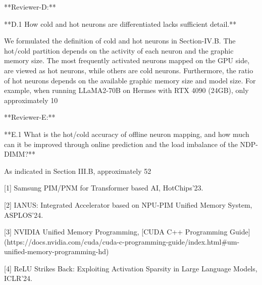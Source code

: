 **Reviewer-D:**

**D.1 How cold and hot neurons are differentiated lacks sufficient detail.**

We formulated the definition of cold and hot neurons in Section-IV.B. The hot/cold partition depends on the activity of each neuron and the graphic memory size. The most frequently activated neurons mapped on the GPU side, are viewed as hot neurons, while others are cold neurons. Furthermore, the ratio of hot neurons depends on the available graphic memory size and model size. For example, when running LLaMA2-70B on Hermes with RTX 4090 (24GB), only approximately 10%

**Reviewer-E:**

**E.1 What is the hot/cold accuracy of offline neuron mapping, and how much can it be improved through online prediction and the load imbalance of the NDP-DIMM?**

As indicated in Section III.B, approximately 52%


[1] Samsung PIM/PNM for Transformer based AI, HotChips'23. 

[2] IANUS: Integrated Accelerator based on NPU-PIM Unified Memory System, ASPLOS'24.

[3] NVIDIA Unified Memory Programming, [CUDA C++ Programming Guide](https://docs.nvidia.com/cuda/cuda-c-programming-guide/index.html#um-unified-memory-programming-hd)

[4] ReLU Strikes Back: Exploiting Activation Sparsity in Large Language Models, ICLR'24. 